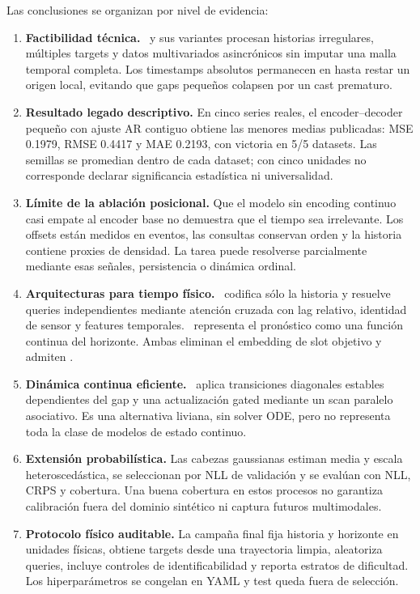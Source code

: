 Las conclusiones se organizan por nivel de evidencia:
\begin{enumerate}
    \item \textbf{Factibilidad técnica.} \CTTransformer\ y sus variantes procesan historias irregulares, múltiples targets y datos multivariados asincrónicos sin imputar una malla temporal completa. Los timestamps absolutos permanecen en  hasta restar un origen local, evitando que gaps pequeños colapsen por un cast prematuro.
    \item \textbf{Resultado legado descriptivo.} En cinco series reales, el encoder--decoder pequeño con ajuste AR contiguo obtiene las menores medias publicadas: MSE 0.1979, RMSE 0.4417 y MAE 0.2193, con victoria en 5/5 datasets. Las semillas se promedian dentro de cada dataset; con cinco unidades no corresponde declarar significancia estadística ni universalidad.
    \item \textbf{Límite de la ablación posicional.} Que el modelo sin encoding continuo casi empate al encoder base no demuestra que el tiempo sea irrelevante. Los offsets están medidos en eventos, las consultas conservan orden y la historia contiene proxies de densidad. La tarea puede resolverse parcialmente mediante esas señales, persistencia o dinámica ordinal.
    \item \textbf{Arquitecturas para tiempo físico.} \QueryCross\ codifica sólo la historia y resuelve queries independientes mediante atención cruzada con lag relativo, identidad de sensor y features temporales. \ContinuousBasis\ representa el pronóstico como una función continua del horizonte. Ambas eliminan el embedding de slot objetivo y admiten \CTSSM.
    \item \textbf{Dinámica continua eficiente.} \CTSSM\ aplica transiciones diagonales estables dependientes del gap y una actualización gated mediante un scan paralelo asociativo. Es una alternativa liviana, sin solver ODE, pero no representa toda la clase de modelos de estado continuo.
    \item \textbf{Extensión probabilística.} Las cabezas gaussianas estiman media y escala heteroscedástica, se seleccionan por NLL de validación y se evalúan con NLL, CRPS y cobertura. Una buena cobertura en estos procesos no garantiza calibración fuera del dominio sintético ni captura futuros multimodales.
    \item \textbf{Protocolo físico auditable.} La campaña final fija historia y horizonte en unidades físicas, obtiene targets desde una trayectoria limpia, aleatoriza queries, incluye controles de identificabilidad y reporta estratos de dificultad. Los hiperparámetros se congelan en YAML y test queda fuera de selección.
\end{enumerate}

